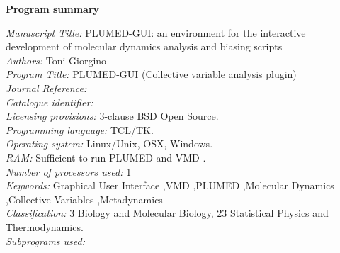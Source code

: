 \documentclass[preprint,review,11pt]{elsarticle}
\newcounter{bla}
\newcommand{\mytitle}{PLUMED-GUI: an environment for the interactive development 
  of molecular dynamics analysis and biasing scripts}
\newcommand{\mykeywords}{Graphical User Interface \sep VMD \sep PLUMED \sep Molecular Dynamics \sep Collective Variables \sep Metadynamics}
\begin{document}
\linenumbers


{\bf Program summary}

\begin{small}
\noindent
{\em Manuscript Title:}                                       
 \mytitle \\
{\em Authors:}                                                
 Toni Giorgino \\
{\em Program Title:}                                          
 PLUMED-GUI (Collective variable analysis plugin) \\
{\em Journal Reference:}                                      \\
{\em Catalogue identifier:}                                   \\
{\em Licensing provisions:}                                   
 3-clause BSD Open Source. \\
{\em Programming language:}                                   
 TCL/TK. \\
{\em Operating system:}                                       
 Linux/Unix, OSX, Windows. \\
{\em RAM:}                                               
 Sufficient to run PLUMED \cite{tribello_plumed_2013} and VMD \cite{Humphrey_Dalke_Schulten_1996}. \\
{\em Number of processors used:}                              
 1 \\
{\em Keywords:} \mykeywords \\
{\em Classification:}                                         
  3 Biology and Molecular Biology, 23 Statistical Physics and Thermodynamics. \\
{\em Subprograms used:}                                       

\end{small}
\end{document}
